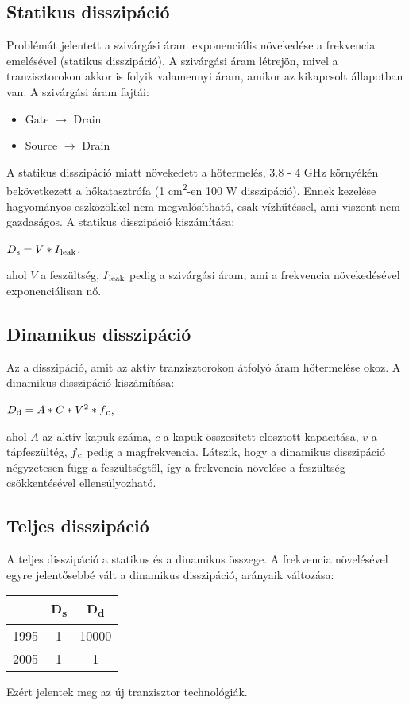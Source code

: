 \subsection{Statikus disszipáció}
Problémát jelentett a szivárgási áram exponenciális növekedése a frekvencia emelésével (statikus disszipáció).
A szivárgási áram létrejön, mivel a tranzisztorokon akkor is folyik valamennyi áram, amikor az kikapcsolt állapotban van.
A szivárgási áram fajtái:
\begin{itemize}
    \item Gate $\rightarrow$ Drain
    \item Source $\rightarrow$ Drain
\end{itemize}
A statikus disszipáció miatt növekedett a hőtermelés, 3.8 - 4 GHz környékén bekövetkezett a hőkatasztrófa (1 cm\textsuperscript{2}-en 100 W disszipáció). Ennek kezelése hagyományos eszközökkel nem megvalósítható, csak vízhűtéssel, ami viszont nem gazdaságos.
A statikus disszipáció kiszámítása:
\begin{center}
    $D\textsubscript{s}=V*I\textsubscript{leak}$,
\end{center}
ahol $V$ a feszültség, $I\textsubscript{leak}$ pedig a szivárgási áram, ami a frekvencia növekedésével exponenciálisan nő.

\subsection{Dinamikus disszipáció}
Az a disszipáció, amit az aktív tranzisztorokon átfolyó áram hőtermelése okoz.
A dinamikus disszipáció kiszámítása:
\begin{center}
    $D\textsubscript{d}=A*C*V^2*f\textsubscript{c}$,
\end{center}
ahol $A$ az aktív kapuk száma, $c$ a kapuk összesített elosztott kapacitása, $v$ a tápfeszültég, $f\textsubscript{c}$ pedig a magfrekvencia.
Látszik, hogy a dinamikus disszipáció négyzetesen függ a feszültségtől, így a frekvencia növelése a feszültség csökkentésével ellensúlyozható.

\subsection{Teljes disszipáció}
A teljes disszipáció a statikus és a dinamikus összege.
A frekvencia növelésével egyre jelentősebbé vált a dinamikus disszipáció, arányaik változása:
\begin{center}
    \begin{tabular}{c | c | c}
             & D\textsubscript{s} & D\textsubscript{d} \\
        \hline
        1995 & 1                  & 10000              \\
        \hline
        2005 & 1                  & 1                  \\
    \end{tabular}
\end{center}
Ezért jelentek meg az új tranzisztor technológiák.

